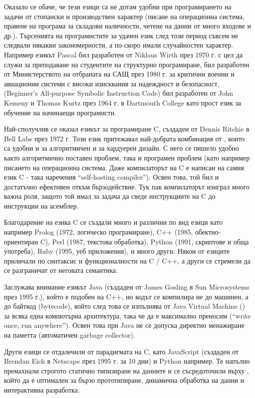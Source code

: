 Оказало се обаче, че тези езици са не дотам удобни при програмирането на задачи от стопански и производствен характер
(писане на операционна система, правене на програма за складови наличности, четене на данни от много входове и др.).
Търсенията на програмистите за удачен език след този период съвсем не следвали някакви закономерности, а по-скоро
имали случайностен характер. Например езикът Pascal бил разработен от Niklaus Wirth през 1970 г. с цел да служи за преподаване на студентите на структурно програмиране,
 бил разработен от Министерството на отбраната на САЩ през 1980 г. за критични военни и авиационни системи с високи изисквания за надеждност и безопасност,
 (Beginner's All-purpose Symbolic Instruction Code) бил разработен от John Kemeny и Thomas Kurtz през 1964 г. в Dartmouth College като прост език за обучение на начинаещи програмисти.

Най-сполучлив се
оказал езикът за програмиране C, създаден от Dennis Ritchie в Bell Labs през 1972 г. Този език притежавал най-добрата
комбинация от , които са удобни и за алгоритмичен и за хардуерен дизайн. С него се пишело удобно както алгоритмично
поставен проблем, така и програмен проблем (като например писането на операционна система. Даже компилаторът на C е написан на самия език C - така наречения ``self-hosting compiler'').
Освен това, той бил и достатъчно ефективен откъм бързодействие. Тук пак компилаторът изиграл много важна роля,
защото той имал за задача да сведе инструкциите на C до инструкции на асемблер.

Благодарение на езика C се създали
много и различни по вид езици като например Prolog (1972, логическо програмиране), C++ (1985, обектно-ориентиран C), Perl (1987, текстова обработка), Python (1991, скриптове и обща употреба), Ruby (1995, уеб приложения), и много други. Някои от езиците приличали по синтаксис
и функционалности на C / C++, а други се стремели да се разграничат от неговата семантика.

Заслужава внимание езикът Java (създаден от James Gosling в Sun Microsystems през 1995 г.),
който е подобен на C++, но кодът се компилира не до машинен, а до байткод (bytecode), който след това се изпълнява от Java Virtual Machine () за всяка една компютърна архитектура, така че да е максимално преносим (``write once, run anywhere''). Освен това при Java не се допуска директно менажиране на паметта (автоматичен garbage collector).

Други езици се отдалечили от парадигмата на C, като JavaScript (създаден от Brendan Eich в Netscape през 1995 г. за 10 дни) и Python например. Те напълно премахнали
строгото статично типизиране на данните и се съсредоточили върху , който да е оптимален за бързо прототипиране, динамична обработка на данни и интерактивна разработка.

